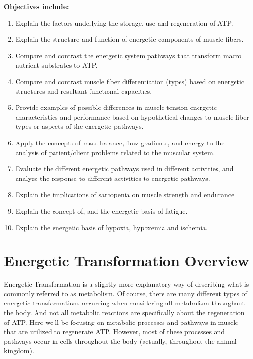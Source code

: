 \textbf{Objectives include:}
\begin{enumerate}
    \item Explain the factors underlying the storage, use and regeneration of ATP.
    \item Explain the structure and function of energetic components of muscle fibers.
    \item Compare and contrast the energetic system pathways that transform macro nutrient substrates to ATP.
    \item Compare and contrast muscle fiber differentiation (types) based on energetic structures and resultant functional capacities.
    \item Provide examples of possible differences in muscle tension energetic characteristics and performance based on hypothetical changes to muscle fiber types or aspects of the energetic pathways.
    \item  Apply the concepts of mass balance, flow gradients, and energy to the analysis of patient/client problems related to the muscular system.
     \item Evaluate the different energetic pathways used in different activities, and analyze the response to different activities to energetic pathways.
     \item Explain the implications of sarcopenia on muscle strength and endurance.
     \item Explain the concept of, and the energetic basis of fatigue.
     \item Explain the energetic basis of hypoxia, hypoxemia and ischemia.
\end{enumerate}

\section{Energetic Transformation Overview}

Energetic Transformation is a slightly more explanatory way of describing what is commonly referred to as metabolism. Of course, there are many different types of energetic transformations occurring when considering all metabolism throughout the body. And not all metabolic reactions are specifically about the regeneration of ATP. Here we'll be focusing on metabolic processes and pathways in muscle that are utilized to regenerate ATP. However, most of these processes and pathways occur in cells throughout the body (actually, throughout the animal kingdom). 

